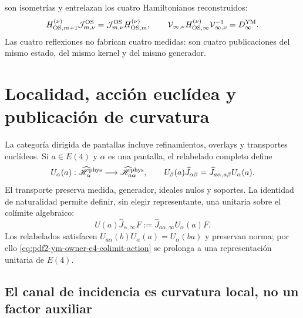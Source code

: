 son isometrías y entrelazan los cuatro Hamiltonianos reconstruidos:
\begin{equation}\label{eq:pdf2-ym-owner-common-os-hamiltonian}
 H_{{\rm OS},m+1}^{(\nu)}\mathcal J_{m,\nu}^{\rm OS}
 =\mathcal J_{m,\nu}^{\rm OS}H_{{\rm OS},m}^{(\nu)},
 \qquad
 \mathcal V_{\infty,\nu}H_{{\rm OS},\infty}^{(\nu)}
 \mathcal V_{\infty,\nu}^{-1}=D_\infty^{\rm YM}.
\end{equation}
Las cuatro reflexiones no fabrican cuatro medidas: son cuatro publicaciones del mismo
estado, del mismo kernel y del mismo generador.

\section{Localidad, acción euclídea y publicación de curvatura}

La categoría dirigida de pantallas incluye refinamientos, overlays y transportes
euclídeos. Si $a\in E(4)$ y $\alpha$ es una pantalla, el relabelado completo define
\begin{equation}\label{eq:pdf2-ym-owner-e4-finite-transport}
 U_\alpha(a):\widehat{\mathscr H}_\alpha^{\rm phys}
 \longrightarrow\widehat{\mathscr H}_{a\alpha}^{\rm phys},
 \qquad
 U_\beta(a)\widehat J_{\alpha\beta}
 =\widehat J_{a\alpha,a\beta}U_\alpha(a).
\end{equation}
El transporte preserva medida, generador, ideales nulos y soportes. La identidad de
naturalidad permite definir, sin elegir representante, una unitaria sobre el colímite
algebraico:
\begin{equation}\label{eq:pdf2-ym-owner-e4-colimit-action}
 U(a)\widehat J_{\alpha,\infty}F
 :=\widehat J_{a\alpha,\infty}U_\alpha(a)F.
\end{equation}
Los relabelados satisfacen $U_{a\alpha}(b)U_\alpha(a)=U_\alpha(ba)$ y preservan
norma; por ello \eqref{eq:pdf2-ym-owner-e4-colimit-action} se prolonga a una
representación unitaria de $E(4)$.

\subsection{El canal de incidencia es curvatura local, no un factor auxiliar}


